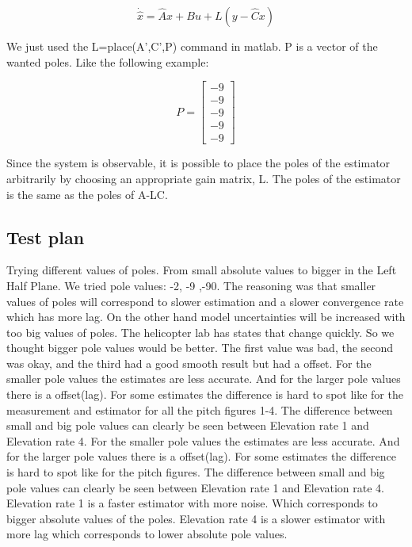 \[
\dot{\hat{x}} = \hat{A}x + Bu + L(y - \hat{C}x)
\]

\vspace{1em}



\noindent
We just used the 
L=place(A',C',P) command in matlab. P is a vector of the wanted poles.
Like the following example:

\[
P = \begin{bmatrix}
-9 \\
-9 \\
-9 \\
-9 \\
-9
\end{bmatrix}
\]

\vspace{1em}



\noindent
 Since the system is observable, it is possible to place the poles of the estimator arbitrarily
 by choosing an appropriate gain matrix, L. The poles of the estimator is the same as
 the poles of A-LC. 
 

 \vspace{1em}
\noindent
 \subsection{Test plan}
 
 \vspace{1em}


Trying different values of poles. 
From small absolute values to bigger in the Left Half Plane.
We tried pole values: -2, -9 ,-90.
The reasoning was that smaller values of poles will correspond to slower estimation and a slower convergence rate which has more lag. On the other hand model uncertainties will be increased with too big values of poles. The helicopter lab has states that change quickly. So we thought bigger pole values would be better.
The first value was bad, the second was okay, and the third had a good smooth result but had a offset.
\vspace{2em}
For the smaller pole values the estimates are less accurate. And for the larger pole values there is a offset(lag). 
For some estimates the difference is hard to spot like for the measurement and estimator for all the pitch figures 1-4.
The difference between small and big pole values can clearly be seen between Elevation rate 1 and Elevation rate 4. 
For the smaller pole values the estimates are less accurate. And for the larger pole values there is a offset(lag). 
For some estimates the difference is hard to spot like for the pitch figures.
The difference between small and big pole values can clearly be seen between Elevation rate 1 and Elevation rate 4. 
Elevation rate 1 is a faster estimator with more noise. Which corresponds to bigger absolute values of the poles.
Elevation rate 4 is a slower estimator with more lag which corresponds to lower absolute pole values. 


